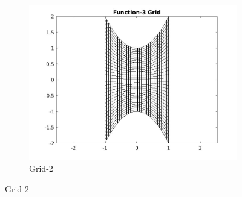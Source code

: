 \documentclass{article}
\begin{document}
\begin{figure}
    \begin{subfigure}{\textwidth}
    \centering
    \includegraphics[scale=0.33]{grid_3.jpeg}
    \caption{Grid-2}
    \label{fig:doc1}
    \end{subfigure}


\end{figure}
\end{document}
